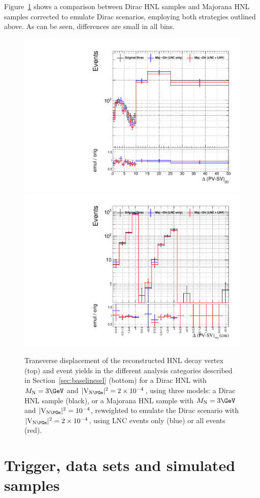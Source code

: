 Figure~\ref{fig:majToDirReweighting} shows a comparison between Dirac
HNL samples and Majorana HNL samples corrected to emulate Dirac
scenarios, employing both strategies outlined above.
As can be seen, differences are small in all bins.
\begin{figure}[h!]
  \centering
  \includegraphics[width = .58\textwidth]{Figures/c4/M-3_V-0p0140356688476_mu_Dirac_from_Majorana_mu_DeltaPV_SV_2D__0.pdf}\\
  \includegraphics[width = .58\textwidth]{Figures/c4/M-3_V-0p0140356688476_mu_Dirac_from_Majorana_mu_SR__0.pdf}
  \caption{Transverse displacement of the reconstructed HNL decay
    vertex \Deltwod (top) and event yields in the different analysis
    categories described in Section~\ref{sec:baselinesel} (bottom)
    for a Dirac HNL with $\mhnl=3\GeV$
    and $\mixparm=2\times 10^{-4}$, using three models:
    a Dirac HNL sample (black), or a Majorana HNL sample with
    $\mhnl=3\GeV$ and $\mixparm=10^{-4}$, reweighted to emulate the
    Dirac scenario with $\mixparm=2\times 10^{-4}$, using LNC events
    only (blue) or all events (red).}
  \label{fig:majToDirReweighting}
\end{figure}

\section{Trigger, data sets and simulated samples}
\label{sec:dataset}

